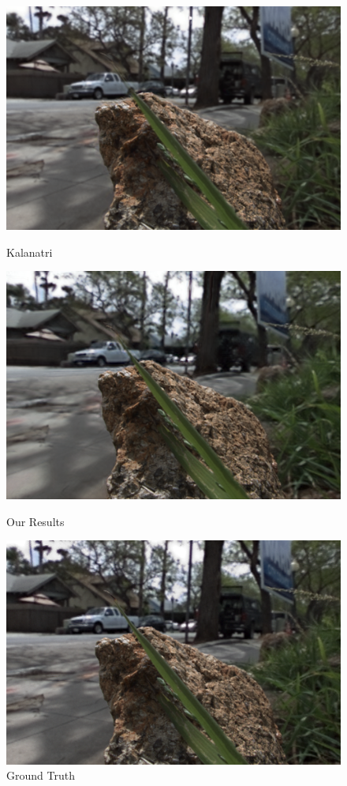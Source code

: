 \documentclass[10pt,twocolumn,letterpaper]{article}
\begin{document}
\begin{figure}[t]
\begin{multicols}{3}
    \end{multicols}
    \begin{multicols}{3}
        \includegraphics[width=\linewidth]{rock/kalantari_05_05.png}\par\caption*{Kalanatri \etal}
        \includegraphics[width=\linewidth]{rock/ours_05_05.png}\par\caption*{Our Results}
        \includegraphics[width=\linewidth]{rock/truth_05_05.png}\par\caption*{Ground Truth}

\end{multicols}
\end{figure}
\end{document}
